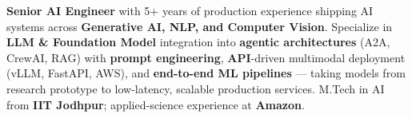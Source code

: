 \documentclass[letter,10pt]{article}
\begin{document}

\textbf{Senior AI Engineer} with 5+ years of production experience shipping AI systems across \textbf{Generative AI, NLP, and Computer Vision}.
Specialize in \textbf{LLM \& Foundation Model} integration into \textbf{agentic architectures} (A2A, CrewAI, RAG) with \textbf{prompt engineering}, \textbf{API}-driven multimodal deployment (vLLM, FastAPI, AWS), and \textbf{end-to-end ML pipelines} — taking models from research prototype to low-latency, scalable production services.
M.Tech in AI from \textbf{IIT Jodhpur}; applied-science experience at \textbf{Amazon}.
\end{document}
